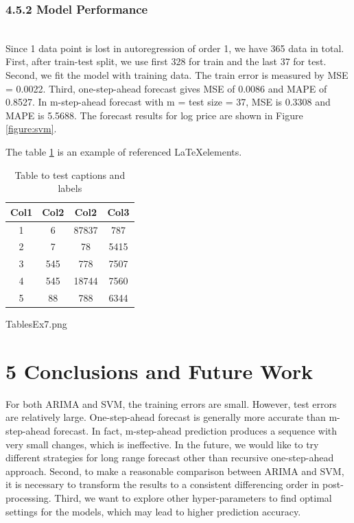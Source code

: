 \documentclass[letterpaper]{article} %
\begin{document}
\subsubsection*{4.5.2 Model Performance}~\\
Since 1 data point is lost in autoregression of order 1, we have 365 data in total. First, after train-test split, we use first 328 for train and the last 37 for test. Second, we fit the model with training data. The train error is measured by MSE = 0.0022. Third, one-step-ahead forecast gives MSE of 0.0086 and MAPE of 0.8527. In m-step-ahead  forecast with m = test size = 37, MSE is 0.3308 and MAPE is 5.5688. The forecast results for log price are shown in Figure \ref{figure:svm}.

The table \ref{table:1} is an example of referenced \LaTeX elements.
 
\begin{table}[h!]
\centering
\begin{tabular}{||c c c c||} 
 \hline
 Col1 & Col2 & Col2 & Col3 \\ [0.5ex] 
 \hline\hline
 1 & 6 & 87837 & 787 \\ 
 2 & 7 & 78 & 5415 \\
 3 & 545 & 778 & 7507 \\
 4 & 545 & 18744 & 7560 \\
 5 & 88 & 788 & 6344 \\ [1ex] 
 \hline
\end{tabular}
\caption{Table to test captions and labels}
\label{table:1}
\end{table}

TablesEx7.png


\section{5 Conclusions and Future Work}
For both ARIMA and SVM, the training errors are small. However, test errors are relatively large. One-step-ahead forecast is generally more accurate than m-step-ahead forecast. In fact, m-step-ahead prediction produces a sequence with very small changes, which is ineffective. In the future, we would like to try different strategies for long range forecast other than recursive one-step-ahead approach. Second, to make a reasonable comparison between ARIMA and SVM, it is necessary to transform the results to a consistent  differencing order in post-processing. Third, we want to explore other hyper-parameters to find optimal settings for the models, which may lead to higher prediction accuracy.




\end{document}
